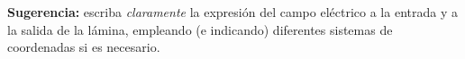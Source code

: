 \documentclass[11pt,spanish]{article}
\begin{document}
\begin{enumerate}
\begin{enumerate}
    \end{enumerate}
    
    \textbf{Sugerencia:} escriba \textit{claramente} la expresión del campo
        eléctrico a la entrada y a la salida de la lámina, empleando (e
        indicando) diferentes sistemas de coordenadas si es necesario.
    
\end{enumerate}
\end{document}
